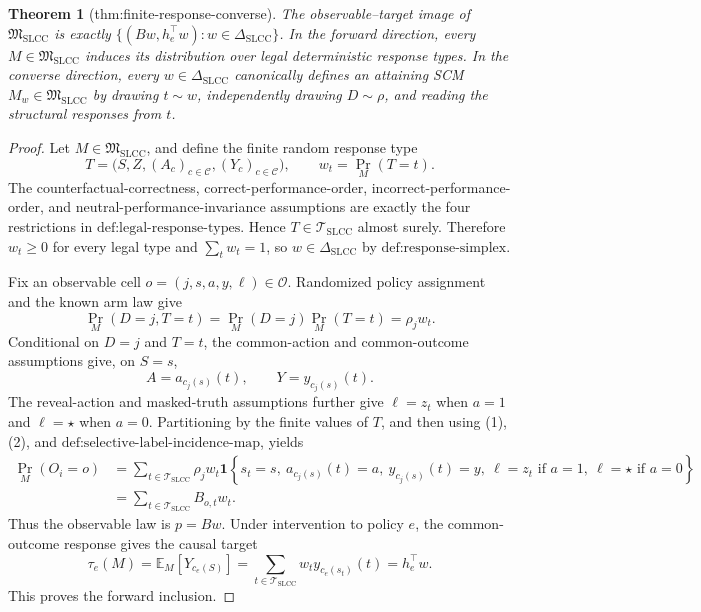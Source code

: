 \documentclass{article}
\newtheorem{theorem}{Theorem}
\begin{document}
\begin{theorem}[thm:finite-response-converse]\label{thm:finite-response-converse}
The observable--target image of \(\mathfrak M_{\mathrm{SLCC}}\) is exactly \(\{(Bw,h_e^{\top}w):w\in\Delta_{\mathrm{SLCC}}\}\). In the forward direction, every \(M\in\mathfrak M_{\mathrm{SLCC}}\) induces its distribution over legal deterministic response types. In the converse direction, every \(w\in\Delta_{\mathrm{SLCC}}\) canonically defines an attaining SCM \(M_w\in\mathfrak M_{\mathrm{SLCC}}\) by drawing \(t\sim w\), independently drawing \(D\sim\rho\), and reading the structural responses from \(t\).
\end{theorem}
\begin{proof}
Let \(M\in\mathfrak M_{\mathrm{SLCC}}\), and define the finite random response type
\[
T=\bigl(S,Z,(A_c)_{c\in\mathcal C},(Y_c)_{c\in\mathcal C}\bigr),
\qquad
w_t=\Pr_M(T=t).
\]
The counterfactual-correctness, correct-performance-order, incorrect-performance-order, and neutral-performance-invariance assumptions are exactly the four restrictions in \(\text{def:legal-response-types}\).  Hence \(T\in\mathcal T_{\mathrm{SLCC}}\) almost surely.  Therefore \(w_t\geq0\) for every legal type and \(\sum_t w_t=1\), so \(w\in\Delta_{\mathrm{SLCC}}\) by \(\text{def:response-simplex}\).

Fix an observable cell \(o=(j,s,a,y,\ell)\in\mathcal O\).  Randomized policy assignment and the known arm law give
\[
\Pr_M(D=j,T=t)=\Pr_M(D=j)\Pr_M(T=t)=\rho_jw_t.
\tag{1}
\]
Conditional on \(D=j\) and \(T=t\), the common-action and common-outcome assumptions give, on \(S=s\),
\[
A=a_{c_j(s)}(t),
\qquad
Y=y_{c_j(s)}(t).
\tag{2}
\]
The reveal-action and masked-truth assumptions further give \(\ell=z_t\) when \(a=1\) and \(\ell=\star\) when \(a=0\).  Partitioning by the finite values of \(T\), and then using (1), (2), and \(\text{def:selective-label-incidence-map}\), yields
\[
\begin{aligned}
\Pr_M(O_i=o)
&=\sum_{t\in\mathcal T_{\mathrm{SLCC}}}
 \rho_jw_t\mathbf 1\!\left\{s_t=s,\ a_{c_j(s)}(t)=a,\ y_{c_j(s)}(t)=y,
 \ \ell=z_t\text{ if }a=1,\ \ell=\star\text{ if }a=0\right\}\\
&=\sum_{t\in\mathcal T_{\mathrm{SLCC}}}B_{o,t}w_t.
\end{aligned}
\tag{3}
\]
Thus the observable law is \(p=Bw\).  Under intervention to policy \(e\), the common-outcome response gives the causal target
\[
\tau_e(M)=\mathbb E_M[Y_{c_e(S)}]
=\sum_{t\in\mathcal T_{\mathrm{SLCC}}}w_t y_{c_e(s_t)}(t)
=h_e^{\top}w.
\tag{4}
\]
This proves the forward inclusion.


\end{proof}
\end{document}
